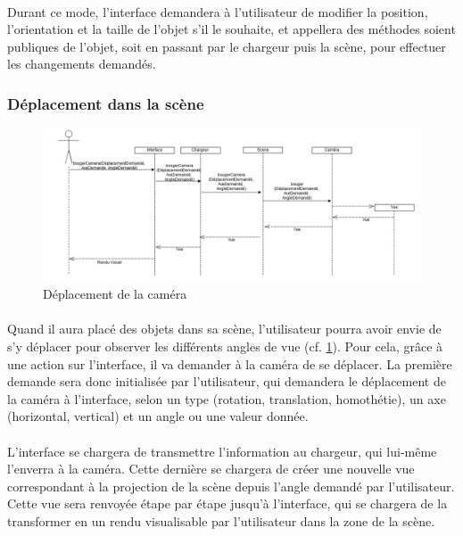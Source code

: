 \paragraph{}
Durant ce mode, l'interface demandera à l'utilisateur de modifier la position, l'orientation et la taille de l'objet s'il le souhaite, et appellera des méthodes soient publiques de l'objet, soit en passant par le chargeur puis la scène, pour effectuer les changements demandés.

\subsubsection{Déplacement dans la scène}

\begin{figure}[h]
		\centering
		\includegraphics[scale=0.4]{bougerCamera.jpg}
		\caption{\label{fig:deplacementCam} Déplacement de la caméra}
\end{figure}

\paragraph{}
Quand il aura placé des objets dans sa scène, l’utilisateur pourra avoir envie de s’y déplacer pour observer les différents angles de vue (cf. \ref{fig:deplacementCam}). Pour cela, grâce à une action sur l’interface, il va demander à la caméra de se déplacer. La première demande sera donc initialisée par l’utilisateur, qui demandera le déplacement de la caméra à l’interface, selon un type (rotation, translation, homothétie), un axe (horizontal, vertical) et un angle ou une valeur donnée.

\paragraph{}
L’interface se chargera de transmettre l’information au chargeur, qui lui-même l’enverra à la caméra. Cette dernière se chargera de créer une nouvelle vue correspondant à la projection de la scène depuis l’angle demandé par l’utilisateur. Cette vue sera renvoyée étape par étape jusqu’à l’interface, qui se chargera de la transformer en un rendu visualisable par l’utilisateur dans la zone de la scène.

